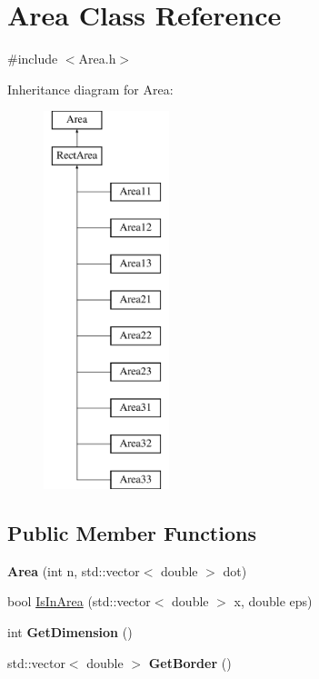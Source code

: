\hypertarget{class_area}{}\section{Area Class Reference}
\label{class_area}


{\ttfamily \#include $<$Area.\+h$>$}

Inheritance diagram for Area\+:\begin{figure}[H]
\begin{center}
\leavevmode
\includegraphics[height=11.000000cm]{class_area}
\end{center}
\end{figure}
\subsection*{Public Member Functions}
\begin{DoxyCompactItemize}
\item 
\mbox{\label{class_area_ace56b94df20ea28011b3a9cd95dc1822}} 
{\bfseries Area} (int n, std\+::vector$<$ double $>$ dot)
\item 
bool \mbox{\hyperlink{class_area_a51d5a60d36a0fd4c45eb374eea1bc976}{Is\+In\+Area}} (std\+::vector$<$ double $>$ x, double eps)
\item 
\mbox{\label{class_area_a0981bb64103aa1fada5c4eb015d16728}} 
int {\bfseries Get\+Dimension} ()
\item 
\mbox{\label{class_area_a976037f5d9dace960388d0bfcfaf1d01}} 
std\+::vector$<$ double $>$ {\bfseries Get\+Border} ()
\end{DoxyCompactItemize}
